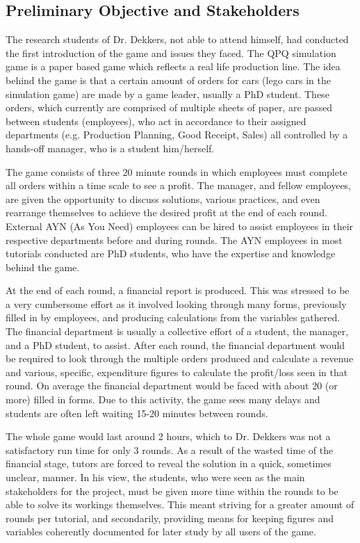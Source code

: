 \documentclass{l3proj}
\begin{document}
\subsection{Preliminary Objective and Stakeholders}
The research students of Dr. Dekkers, not able to attend himself, had conducted the first introduction of the game and issues they faced. The QPQ simulation game is a paper based game which reflects a real life production line. The idea behind the game is that a certain amount of orders for cars (lego cars in the simulation game) are made by a game leader, usually a PhD student. These orders, which currently are comprised of multiple sheets of paper, are passed between students (employees), who act in accordance to their assigned departments (e.g. Production Planning, Good Receipt, Sales) all controlled by a hands-off manager, who is a student him/herself. 

The game consists of three 20 minute rounds in which employees must complete all orders within a time scale to see a profit. The manager, and fellow employees, are given the opportunity to discuss solutions, various practices, and even rearrange themselves to achieve the desired profit at the end of each round. External AYN (As You Need) employees can be hired to assist employees in their respective departments before and during rounds. The AYN employees in most tutorials conducted are PhD students, who have the expertise and knowledge behind the game.

At the end of each round, a financial report is produced. This was stressed to be a very cumbersome effort as it involved looking through many forms, previously filled in by employees, and producing calculations from the variables gathered. The financial department is usually a collective effort of a student, the manager, and a PhD student, to assist. After each round, the financial department would be required to look through the multiple orders produced and calculate a revenue and various, specific, expenditure figures to calculate the profit/loss seen in that round. On average the financial department would be faced with about 20 (or more) filled in forms. Due to this activity, the game sees many delays and students are often left waiting 15-20 minutes between rounds.

The whole game would last around 2 hours, which to Dr. Dekkers was not a satisfactory run time for only 3 rounds. As a result of the wasted time of the financial stage, tutors are forced to reveal the solution in a quick, sometimes unclear, manner. In his view, the students, who were seen as the main stakeholders for the project, must be given more time within the rounds to be able to solve its workings themselves. This meant striving for a greater amount of rounds per tutorial, and secondarily, providing means for keeping figures and variables coherently documented for later study by all users of the game.
\end{document}
